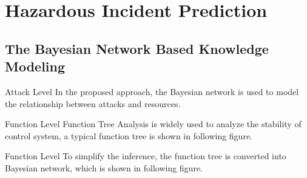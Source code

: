\label{Section: Hazardous Incident Prediction}
\section{Hazardous Incident Prediction}
\subsection{The Bayesian Network Based Knowledge Modeling}
\begin{frame}{Attack Level}
    \label{Hazardous Incident Prediction: Attack Level}
    In the proposed approach, the Bayesian network is used to model the relationship between attacks and resources.
    \begin{center}
      
    \end{center}
\end{frame}

\begin{frame}{Function Level}
    \label<trans:1>{Hazardous Incident Prediction: Function Tree F1}
    \label<trans:2>{Hazardous Incident Prediction: Function Tree F2}
    \label<trans:3>{Hazardous Incident Prediction: Function Tree F5}
    Function Tree Analysis is widely used to analyze the stability of control system, a typical function tree is shown in following figure.
    \begin{center}
      
    \end{center}

    \begin{overlayarea}{\textwidth}{1cm}
    \end{overlayarea}
\end{frame}

\begin{frame}{Function Level}
    \label<trans:1>{Hazardous Incident Prediction: Function Tree to Bayesian Network Gate 1}
    \label<trans:2>{Hazardous Incident Prediction: Function Tree to Bayesian Network Gate 2}
    \label<trans:3>{Hazardous Incident Prediction: Function Tree to Bayesian Network Gate 3}
    To simplify the inference, the function tree is converted into Bayesian network, which is shown in following figure.\\
    \begin{overlayarea}{\textwidth}{6cm}
    \begin{center}
    \end{center}
    \end{overlayarea}
\end{frame}

